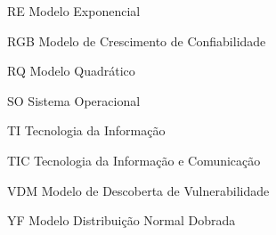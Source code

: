 \begin{siglas}
	
	
    \item[RE] Modelo Exponencial
    \item[RGB] Modelo de Crescimento de Confiabilidade
    \item[RQ] Modelo Quadrático
	
	\item[SO] Sistema Operacional
    
    \item[TI] Tecnologia da Informação
	\item[TIC] Tecnologia da Informação e Comunicação
    
	
	
    \item[VDM] Modelo de Descoberta de Vulnerabilidade
	
	
    \item[YF] Modelo Distribuição Normal Dobrada
	

\end{siglas}


